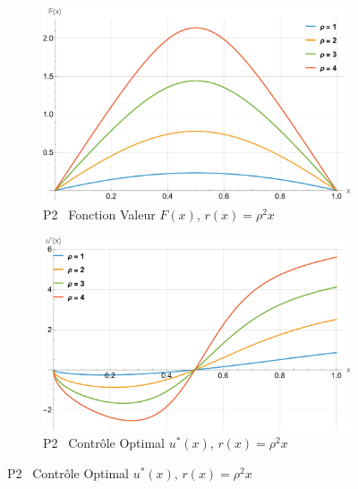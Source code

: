 \begin{figure}[htb]
    \centering
    \begin{subfigure}{0.49\linewidth}
        \includegraphics[width=\linewidth]{img/validation/P2/p2_R_value.pdf}
        \caption{P2 \textemdash~Fonction Valeur $F(x)$, $r(x)=\rho^2x$}\label{fig:RhoValueVisualisation2}
    \end{subfigure}
    \hfill
    \begin{subfigure}{0.49\linewidth}
        \includegraphics[width=\linewidth]{img/validation/P2/p2_R_control.pdf}
        \caption{P2 \textemdash~Contrôle Optimal $u^*(x)$, $r(x)=\rho^2x$}\label{fig:RhoControlVisualisation2}
    \end{subfigure}


\end{figure}
